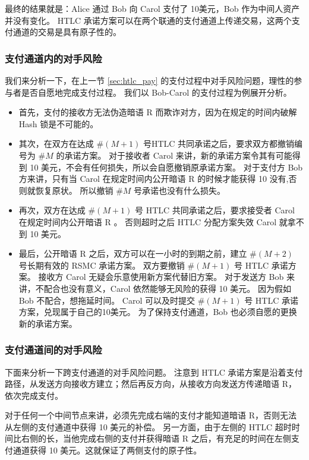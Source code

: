 最终的结果就是：Alice 通过 Bob 向 Carol 支付了 10美元，Bob 作为中间人资产并没有变化。
HTLC 承诺方案可以在两个联通的支付通道上传递交易，这两个支付通道的交易是具有原子性的。

\subsubsection{支付通道内的对手风险}
我们来分析一下，在上一节 \ref{sec:htlc_pay} 的支付过程中对手风险问题，理性的参与者是否自愿地完成支付过程。
我们以 Bob-Carol 的支付过程为例展开分析。

\begin{itemize}
  \item 首先，支付的接收方无法伪造暗语 R 而欺诈对方，因为在规定的时间内破解 Hash 锁是不可能的。

  \item 其次，在双方在达成 $\#(M+1)$ 号HTLC 共同承诺之后，要求双方都撤销编号为 $\#M$ 的承诺方案。
        对于接收者 Carol 来讲，新的承诺方案令其有可能得到 10 美元，不会有任何损失，所以会自愿撤销原承诺方案。
        对于支付方 Bob 方来讲，只有当 Carol 在规定时间内公开暗语 R 的时候才能获得 10 没有,否则就恢复原状。
        所以撤销 $\#M$ 号承诺也没有什么损失。

  \item 再次，双方在达成  $\#(M+1)$ 号 HTLC 共同承诺之后，要求接受者 Carol 在规定时间内公开暗语 R 。
        否则超时之后 HTLC 分配方案失效 Carol 就拿不到 10 美元。

  \item 最后，公开暗语 R 之后，双方可以在一小时的到期之前，建立 $\#(M+2)$ 号长期有效的 RSMC 承诺方案。
        双方要撤销 $\#(M+1)$ 号 HTLC 承诺方案。
        接收方 Carol 无疑会乐意使用新方案代替旧方案。
        对于发送方 Bob 来讲，不配合也没有意义，Carol 依然能够无风险的获得 10 美元。
        因为假如 Bob 不配合，想拖延时间。
        Carol 可以及时提交 $\#(M+1)$ 号 HTLC 承诺方案，兑现属于自己的10美元。
        为了保持支付通道，Bob 也必须自愿的更换新的承诺方案。

\end{itemize}

\subsubsection{支付通道间的对手风险}
下面来分析一下跨支付通道的对手风险问题。
注意到 HTLC 承诺方案是沿着支付路径，从发送方向接收方建立；然后再反方向，从接收方向发送方传递暗语 R，依次完成支付。

对于任何一个中间节点来讲，必须先完成右端的支付才能知道暗语 R，否则无法从左侧的支付通道中获得 10 美元的补偿。
另一方面，由于左侧的 HTLC 超时时间比右侧的长，当他完成右侧的支付并获得暗语 R 之后，有充足的时间在左侧支付通道获得 10 美元。这就保证了两侧支付的原子性。

